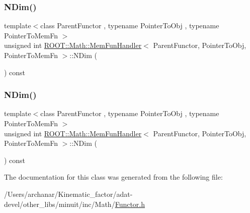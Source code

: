 \subsubsection{\texorpdfstring{NDim()}{NDim()}\hspace{0.1cm}{\footnotesize\ttfamily [2/3]}}
{\footnotesize\ttfamily template$<$class Parent\+Functor , typename Pointer\+To\+Obj , typename Pointer\+To\+Mem\+Fn $>$ \\
unsigned int \mbox{\hyperlink{classROOT_1_1Math_1_1MemFunHandler}{R\+O\+O\+T\+::\+Math\+::\+Mem\+Fun\+Handler}}$<$ Parent\+Functor, Pointer\+To\+Obj, Pointer\+To\+Mem\+Fn $>$\+::N\+Dim (\begin{DoxyParamCaption}{ }\end{DoxyParamCaption}) const\hspace{0.3cm}{\ttfamily [inline]}}

\mbox{\label{classROOT_1_1Math_1_1MemFunHandler_a6685da729cc491d0ee9b3857a400d98c}} 
\subsubsection{\texorpdfstring{NDim()}{NDim()}\hspace{0.1cm}{\footnotesize\ttfamily [3/3]}}
{\footnotesize\ttfamily template$<$class Parent\+Functor , typename Pointer\+To\+Obj , typename Pointer\+To\+Mem\+Fn $>$ \\
unsigned int \mbox{\hyperlink{classROOT_1_1Math_1_1MemFunHandler}{R\+O\+O\+T\+::\+Math\+::\+Mem\+Fun\+Handler}}$<$ Parent\+Functor, Pointer\+To\+Obj, Pointer\+To\+Mem\+Fn $>$\+::N\+Dim (\begin{DoxyParamCaption}{ }\end{DoxyParamCaption}) const\hspace{0.3cm}{\ttfamily [inline]}}



The documentation for this class was generated from the following file\+:\begin{DoxyCompactItemize}
\item 
/\+Users/archanar/\+Kinematic\+\_\+factor/adat-\/devel/other\+\_\+libs/minuit/inc/\+Math/\mbox{\hyperlink{adat-devel_2other__libs_2minuit_2inc_2Math_2Functor_8h}{Functor.\+h}}\end{DoxyCompactItemize}
